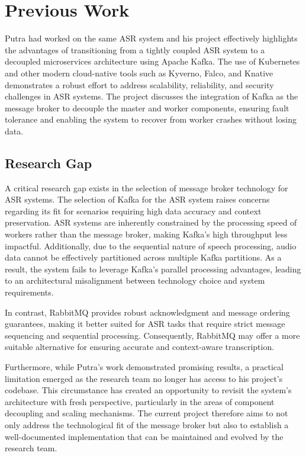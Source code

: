 \section{Previous Work}
Putra \cite{putra} had worked on the same ASR system and his project effectively highlights the advantages of transitioning from a tightly coupled ASR system to a decoupled microservices architecture using Apache Kafka. The use of Kubernetes and other modern cloud-native tools such as Kyverno, Falco, and Knative demonstrates a robust effort to address scalability, reliability, and security challenges in ASR systems. The project discusses the integration of Kafka as the message broker to decouple the master and worker components, ensuring fault tolerance and enabling the system to recover from worker crashes without losing data.

\subsection{Research Gap}
A critical research gap exists in the selection of message broker technology for ASR systems. The selection of Kafka for the ASR system raises concerns regarding its fit for scenarios requiring high data accuracy and context preservation. ASR systems are inherently constrained by the processing speed of workers rather than the message broker, making Kafka’s high throughput less impactful. Additionally, due to the sequential nature of speech processing, audio data cannot be effectively partitioned across multiple Kafka partitions. As a result, the system fails to leverage Kafka’s parallel processing advantages, leading to an architectural misalignment between technology choice and system requirements.

In contrast, RabbitMQ provides robust acknowledgment and message ordering guarantees, making it better suited for ASR tasks that require strict message sequencing and sequential processing. Consequently, RabbitMQ may offer a more suitable alternative for ensuring accurate and context-aware transcription.

Furthermore, while Putra’s work \cite{putra} demonstrated promising results, a practical limitation emerged as the research team no longer has access to his project's codebase. This circumstance has created an opportunity to revisit the system's architecture with fresh perspective, particularly in the areas of component decoupling and scaling mechanisms. The current project therefore aims to not only address the technological fit of the message broker but also to establish a well-documented implementation that can be maintained and evolved by the research team.

